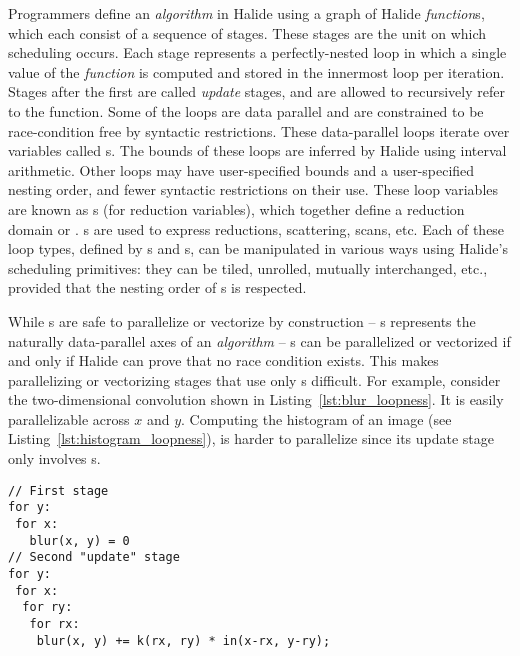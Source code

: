 Programmers define an \emph{algorithm} in Halide using a graph of Halide \emph{function}s, which each consist of a sequence of stages. These stages are the unit on which scheduling occurs. Each stage represents a perfectly-nested loop in which a single value of the \emph{function} is computed and stored in the innermost loop per iteration. Stages after the first are called \emph{update} stages, and are allowed to recursively refer to the function. Some of the loops are data parallel and are constrained to be race-condition free by syntactic restrictions. These data-parallel loops iterate over variables called s. The bounds of these loops are inferred by Halide using interval arithmetic. Other loops may have user-specified bounds and a user-specified nesting order, and fewer syntactic restrictions on their use. These loop variables are known as s (for reduction variables), which together define a reduction domain or . s are used to express reductions, scattering, scans, etc. Each of these loop types, defined by s and s, can be manipulated in various ways using Halide's scheduling primitives: they can be tiled, unrolled, mutually interchanged, etc., provided that the nesting order of s is respected.

While s are safe to parallelize or vectorize by construction -- s represents the naturally data-parallel axes of an \emph{algorithm} -- s can be parallelized or vectorized if and only if Halide can prove that no race condition exists. This makes parallelizing or vectorizing stages that use only s difficult. For example, consider the two-dimensional convolution shown in Listing~\ref{lst:blur_loopness}. It is easily parallelizable across  $x$ and $y$. Computing the histogram of an image (see Listing~\ref{lst:histogram_loopness}), is harder to parallelize since its update stage only involves s.

\begin{lstlisting}[float,caption={Pseudocode for convolution. This algorithm reduces over \code{rx} and \code{ry} and is data-parallel over \code{x} and \code{y}. In the Halide source, \code{rx} and \code{ry} would be \code{RVar}s in a two-dimensional \code{RDom}. \code{x} and \code{y} would be \code{Var}s.}, label={lst:blur_loopness}]
// First stage
for y:
 for x:
   blur(x, y) = 0
// Second "update" stage
for y:
 for x:
  for ry:
   for rx:
    blur(x, y) += k(rx, ry) * in(x-rx, y-ry);
\end{lstlisting}

